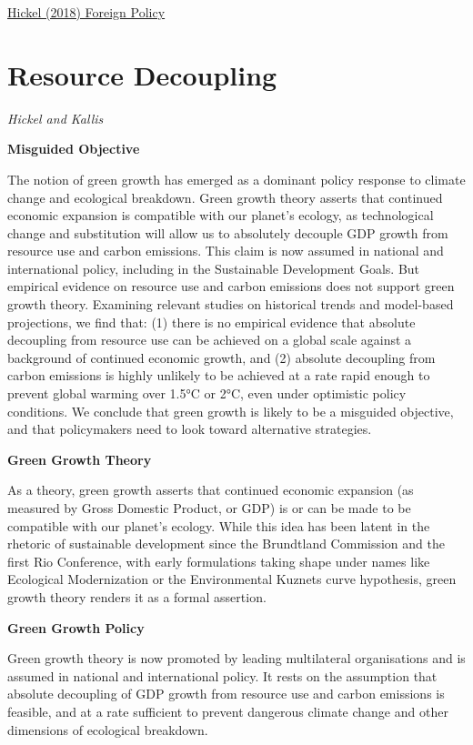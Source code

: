 \documentclass[
]{book}
\begin{document}
\href{https://foreignpolicy.com/2018/09/12/why-growth-cant-be-green/}{Hickel (2018) Foreign Policy}

\hypertarget{resource-decoupling}{%
\section{Resource Decoupling}\label{resource-decoupling}}

\emph{Hickel and Kallis}

\textbf{Misguided Objective}

The notion of green growth has emerged as a dominant policy response to
climate change and ecological breakdown. Green growth theory asserts
that continued economic expansion is compatible with our planet's
ecology, as technological change and substitution will allow us to
absolutely decouple GDP growth from resource use and carbon
emissions. This claim is now assumed in national and international
policy, including in the Sustainable Development Goals. But empirical
evidence on resource use and carbon emissions does not support green
growth theory. Examining relevant studies on historical trends and
model-based projections, we find that: (1) there is no empirical evidence
that absolute decoupling from resource use can be achieved on a global
scale against a background of continued economic growth, and (2)
absolute decoupling from carbon emissions is highly unlikely to be
achieved at a rate rapid enough to prevent global warming over 1.5°C
or 2°C, even under optimistic policy conditions. We conclude that green
growth is likely to be a misguided objective, and that policymakers need
to look toward alternative strategies.

\textbf{Green Growth Theory}

As a theory, green growth asserts that continued
economic expansion (as measured by Gross Domestic Product, or GDP) is or can be made to be
compatible with our planet's ecology.
While this idea has been latent in the rhetoric of sustainable development
since the Brundtland Commission and the first Rio Conference, with
early formulations taking shape under names like Ecological Modernization or
the Environmental Kuznets curve hypothesis,
green growth theory renders it as a formal assertion.

\textbf{Green Growth Policy}

Green growth theory is now promoted by leading multilateral organisations and is assumed in
national and international policy. It rests on the assumption that absolute decoupling of GDP
growth from resource use and carbon emissions is feasible, and at a rate
sufficient to prevent dangerous climate change and other dimensions of ecological breakdown.
\end{document}
